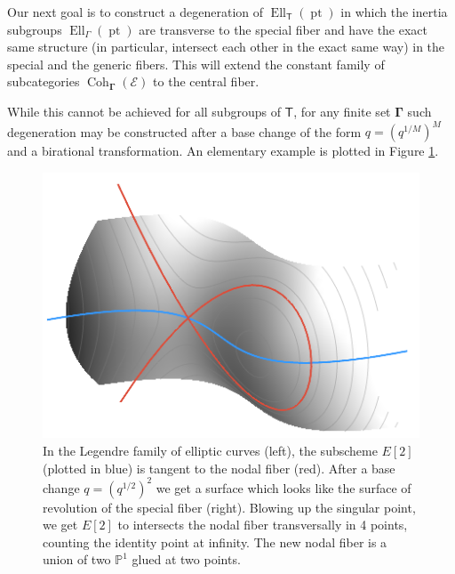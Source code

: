 \documentclass[14pt]{extarticle}
\newcommand{\bT}{\mathsf{T}}
\newcommand{\bP}{\mathbb{P}}
\newcommand{\cE}{\mathscr{E}}
\newcommand{\bGamma}{\boldsymbol{\Gamma}}
\DeclareMathOperator{\Coh}{Coh}
\DeclareMathOperator{\Ell}{Ell}
\DeclareMathOperator{\pt}{pt}
\theoremstyle{definition}
\begin{document}
Our next goal is to construct a degeneration of $\Ell_\bT(\pt)$ in
which the inertia subgroups $\Ell_\Gamma(\pt)$ 
are transverse to the special fiber and  have
the exact same structure (in particular, intersect each other in the exact
same way) in the special and the generic fibers. This will extend the
constant family of subcategories $\Coh_{\bGamma}(\cE)$  to the central
fiber. 

While this cannot be achieved for all subgroups of $\bT$, for any
finite set $\bGamma$ such degeneration may be
constructed after a base change of the form $q=(q^{1/M})^M$ and a birational
transformation. An elementary example
is plotted in Figure \ref{fLeg}. 


\begin{figure}[!h]
  \centering
  \includegraphics[scale=0.33]{Legendre1.png}
  \hspace{0.5cm}
 \caption{In the Legendre family of elliptic curves (left), the
   subscheme $E[2]$ (plotted in blue) is tangent to the nodal fiber (red). After a base
   change $q=(q^{1/2})^2$ we get a surface which looks like the
   surface of revolution of the special fiber (right). Blowing up the
   singular point, we get $E[2]$ to intersects the nodal fiber
   transversally in 4 points, counting the identity point at
   infinity. The new nodal fiber is a union of two $\bP^1$ glued at
   two points.}
\label{fLeg}
\end{figure}
\end{document}
